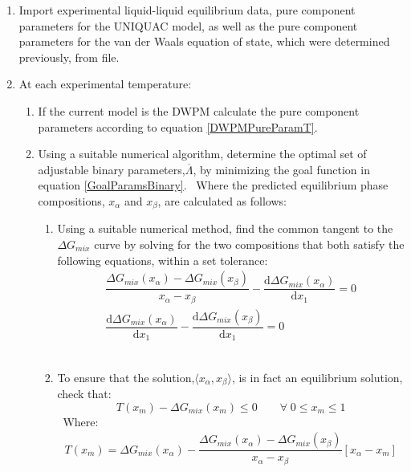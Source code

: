 \begin{enumerate}
\item Import experimental liquid-liquid equilibrium data, pure component parameters for the UNIQUAC model, as well as the pure component parameters for the van der Waals equation of state, which were determined previously, from file.\
\item At each experimental temperature:\
		\begin{enumerate}
		\item If the current model is the DWPM calculate the pure component parameters according to equation \ref{DWPMPureParamT}.\
		\item Using a suitable numerical algorithm, determine the optimal set of adjustable binary parameters,$\overline{\Lambda}$, by minimizing the goal function in equation \ref{GoalParamsBinary}. \label{BinaryParamsOptStep}\
		Where the predicted equilibrium phase compositions, $x_{\alpha}$ and $x_{\beta}$, are calculated as follows:\
		\begin{enumerate}
			\item Using a suitable numerical method, find the common tangent to the $\Delta G_{mix}$ curve by solving for the two compositions that 			both satisfy the following equations, within a set tolerance: \label{PhaseEquilOptStep}\
			\begin{eqnarray}
		 	\dfrac{\Delta G_{mix}\left(x_{\alpha}\right)- \Delta G_{mix}\left(x_{\beta }\right)}{x_{\alpha}-					x_{\beta}} - \dfrac{\mathrm{d}\Delta G_{mix}\left(x_{\alpha}\right)}{\mathrm{d}x_{1}} =0\label{GoalPhaseEq1}\\
		 	\dfrac{\mathrm{d} \Delta G_{mix}\left(x_{\alpha}\right)}{\mathrm{d}x_{1}} - \dfrac{\mathrm{d}\Delta G_{mix}\left(x_{\beta}\right)}{\mathrm{d}x_{1}}=0\label{GoalPhaseEq2}\
			\end{eqnarray}\
			\item To ensure that the solution,$\langle x_{\alpha}, x_{\beta}\rangle$, is in fact an equilibrium solution, check that:\
			\begin{equation}
			 T\left(x_{m}\right)-\Delta G_{mix}\left(x_{m}\right) \leq0 \qquad \forall \; 0\leq x_{m} \leq 1 \label{PhaseEquilTPConstraints}
			\end{equation}\
			Where:\
			\begin{eqnarray}
			T\left(x_{m}\right) = \Delta G_{mix}\left(x_{\alpha}\right) -\dfrac{\Delta G_{mix}\left(x_{\alpha}\right)- \Delta G_{mix}\left(x_{\beta }\right)}{x_{\alpha}-x_{\beta}}\left[x_{\alpha} -x_{m}\right]\nonumber\\

\end{eqnarray}
\end{enumerate}
\end{enumerate}
\end{enumerate}
